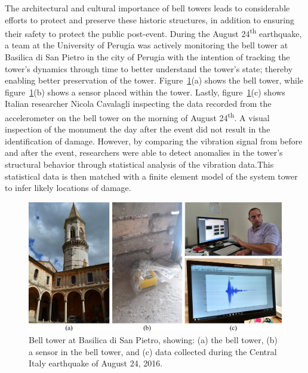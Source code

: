 \documentclass[12pt,letter]{article}
\begin{document}
\begin{vibration_case_study}
	The architectural and cultural importance of bell towers leads to considerable efforts to protect and preserve these historic structures, in addition to ensuring their safety to protect the public post-event. During the August 24\textsuperscript{th} earthquake, a team at the University of Perugia was actively monitoring the bell tower at Basilica di San Pietro in the city of Perugia with the intention of tracking the tower's dynamics through time to better understand the tower's state; thereby enabling better preservation of the tower.  Figure~\ref{fig:Italy_2016_earthquake_2}(a) shows the bell tower, while figure~\ref{fig:Italy_2016_earthquake_2}(b) shows a sensor placed within the tower. Lastly, figure~\ref{fig:Italy_2016_earthquake_2}(c) shows Italian researcher Nicola Cavalagli inspecting the data recorded from the accelerometer on the bell tower on the morning of August 24\textsuperscript{th}. A visual inspection of the monument the day after the event did not result in the identification of damage. However, by comparing the vibration signal from before and after the event, researchers were able to detect anomalies in the tower's structural behavior through statistical analysis of the vibration data.\protect\footnotemark[2] This statistical data is then matched with a finite element model of the system tower to infer likely locations of damage.  
	
	\begin{figure}[H]
		\centering
		\includegraphics[width=1\textwidth]{../figures/Italy_2016_earthquake_2}
		\caption{Bell tower at Basilica di San Pietro, showing: (a) the bell tower, (b) a sensor in the bell tower, and (c) data collected during the Central Italy earthquake of August 24, 2016. \protect\footnotemark[3] }
		\label{fig:Italy_2016_earthquake_2}
	\end{figure}

										
										
\end{vibration_case_study}
\end{document}
